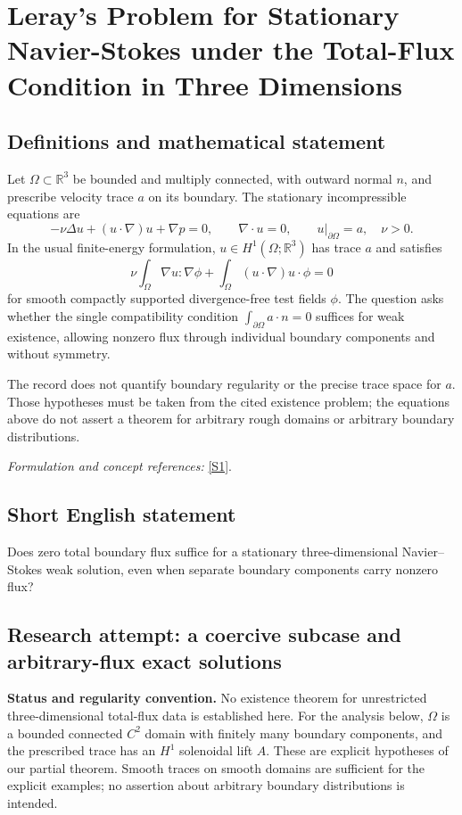 \documentclass[11pt]{article}
\begin{document}
\section*{\texorpdfstring{Leray's Problem for Stationary Navier-Stokes under the Total-Flux Condition in Three Dimensions}{Leray's Problem for Stationary Navier-Stokes under the Total-Flux Condition in Three Dimensions}}\label{30006952}
\subsection{Definitions and mathematical statement}
Let $\Omega\subset{\mathbb{R}}^3$ be bounded and multiply connected, with outward normal $n$, and prescribe velocity trace $a$ on its boundary. The stationary incompressible equations are
\[
 -\nu\Delta u+(u\cdot\nabla)u+\nabla p=0,
 \qquad\nabla\cdot u=0,\qquad u|_{\partial\Omega}=a,
 \quad\nu>0.
\]
In the usual finite-energy formulation, $u\in H^1(\Omega;{\mathbb{R}}^3)$ has trace $a$ and satisfies
\[
 \nu\int_\Omega\nabla u:\nabla\phi
 +\int_\Omega (u\cdot\nabla)u\cdot\phi=0
\]
for smooth compactly supported divergence-free test fields $\phi$. The question asks whether the single compatibility condition $\int_{\partial\Omega}a\cdot n=0$ suffices for weak existence, allowing nonzero flux through individual boundary components and without symmetry.

The record does not quantify boundary regularity or the precise trace space for $a$. Those hypotheses must be taken from the cited existence problem; the equations above do not assert a theorem for arbitrary rough domains or arbitrary boundary distributions.
\par\smallskip\textit{Formulation and concept references:} \href{https://ejde.math.txstate.edu/Volumes/2023/26/foreidooni.pdf}{[S1]}.

\subsection{Short English statement}
Does zero total boundary flux suffice for a stationary three-dimensional Navier--Stokes weak solution, even when separate boundary components carry nonzero flux?
\subsection{Research attempt: a coercive subcase and arbitrary-flux exact solutions}
\textbf{Status and regularity convention.} No existence theorem for unrestricted three-dimensional total-flux data is established here. For the analysis below, $\Omega$ is a bounded connected $C^2$ domain with finitely many boundary components, and the prescribed trace has an $H^1$ solenoidal lift $A$. These are explicit hypotheses of our partial theorem. Smooth traces on smooth domains are sufficient for the explicit examples; no assertion about arbitrary boundary distributions is intended.
\end{document}
